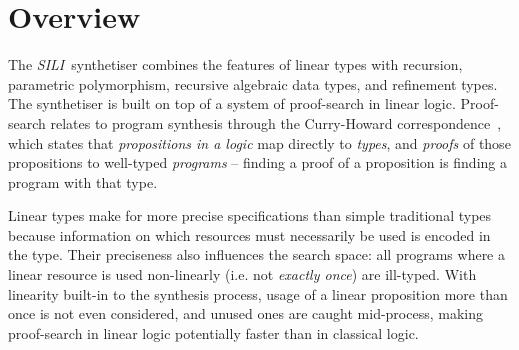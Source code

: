\documentclass{llncs}
\newcommand{\mypara}[1]{\paragraph{\textbf{#1}.}}
\newcommand{\synname}{\emph{SILI}}
\begin{document}



\section{Overview}\label{sec:overview}

The \synname\ synthetiser combines the features of linear types with recursion,
parametric polymorphism, recursive algebraic data types, and
refinement types. The synthetiser is built on top of a system of proof-search in
linear logic. Proof-search relates to program synthesis through the Curry-Howard
correspondence~\cite{}, which states that \emph{propositions in a logic} map
directly to \emph{types}, and \emph{proofs} of those propositions to well-typed
\emph{programs} -- finding a proof of a proposition is finding a program with
that type.

Linear types make for more precise specifications than simple traditional types
because information on which resources must necessarily be used is encoded in
the type. Their preciseness also influences the search space: all programs where
a linear resource is used non-linearly (i.e. not \emph{exactly once}) are
ill-typed. With linearity built-in to the synthesis process, usage of a
linear proposition more than once is not even considered, and unused ones are caught
mid-process, making proof-search in linear logic potentially faster than
in classical logic.  %
\end{document}
